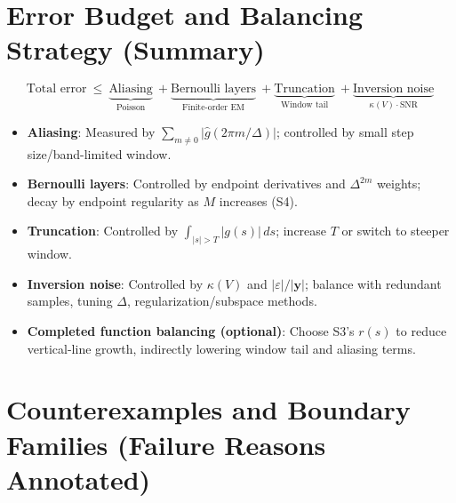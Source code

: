 \documentclass[11pt,a4paper]{article}
\theoremstyle{remark}
\begin{document}
\section{Error Budget and Balancing Strategy (Summary)}

\begin{equation}
\boxed{
\text{Total error}\ \le\
\underbrace{\text{Aliasing}}_{\text{Poisson}}\ +
\underbrace{\text{Bernoulli layers}}_{\text{Finite-order EM}}\ +
\underbrace{\text{Truncation}}_{\text{Window tail}}\ +
\underbrace{\text{Inversion noise}}_{\kappa(V)\cdot \text{SNR}}
}
\end{equation}

\begin{itemize}
\item \textbf{Aliasing}: Measured by $\sum_{m\ne0}\bigl|\widehat{g}(2\pi m/\Delta)\bigr|$; controlled by small step size/band-limited window.
\item \textbf{Bernoulli layers}: Controlled by endpoint derivatives and $\Delta^{2m}$ weights; decay by endpoint regularity as $M$ increases (S4).
\item \textbf{Truncation}: Controlled by $\int_{|s|>T}|g(s)|\,ds$; increase $T$ or switch to steeper window.
\item \textbf{Inversion noise}: Controlled by $\kappa(V)$ and $|\varepsilon|/|\mathbf{y}|$; balance with redundant samples, tuning $\Delta$, regularization/subspace methods.
\item \textbf{Completed function balancing (optional)}: Choose S3's $r(s)$ to reduce vertical-line growth, indirectly lowering window tail and aliasing terms.
\end{itemize}

\section{Counterexamples and Boundary Families (Failure Reasons Annotated)}
\end{document}

